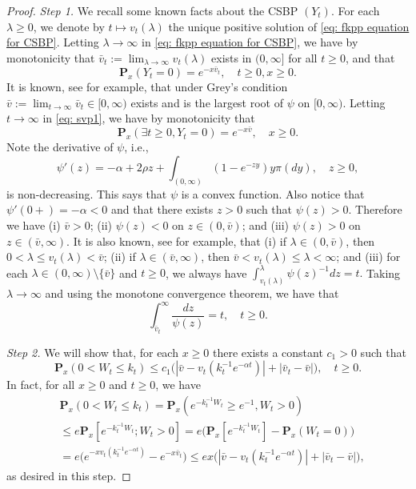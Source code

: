 \documentclass[EJP]{ejpecp} %
\begin{document}
\begin{proof}
	\emph{Step 1.} We recall some known facts about the CSBP $(Y_t)$.
  	For each $\lambda \geq 0$, we denote by $t\mapsto v_t(\lambda)$ the unique positive solution of \eqref{eq: fkpp equation for CSBP}.
  	Letting $\lambda \to \infty$ in \eqref{eq: fkpp equation for CSBP}, we have by monotonicity that $\bar v_t:= \lim_{\lambda \to \infty}v_t(\lambda)$ exists in $(0,\infty]$ for all $t\geq 0$, and that
\begin{equation}
\label{eq: svp1}
    \mathbf P_x(Y_t = 0)
    =e^{-x\bar v_t}, \quad t\geq 0, x\ge 0.
\end{equation}
  	It is known, see \cite[Theorems 3.5--3.8]{Li2011Measure-valued} for example, that under Grey's condition $\bar v:= \lim_{t\to \infty} \bar v_t \in [0,\infty)$ exists and is the largest root of $\psi$ on $[0,\infty)$.
  	Letting $t \to \infty$ in \eqref{eq: svp1}, we have by monotonicity that
\[
    \mathbf P_x(\exists t \geq 0, Y_t = 0)
    = e^{-x\bar v}, \quad x\geq 0.
\]
	Note the derivative of $\psi$, i.e.,
\[
    \psi'(z)
    = -\alpha + 2\rho z + \int_{(0,\infty)}(1-e^{-zy})y\pi(dy),\quad z\geq 0,
\]
  	is non-decreasing.
	This says that $\psi$ is a convex function.
  	Also notice that $\psi'(0+)=-\alpha <0$ and that there exists $z>0$ such that $\psi(z)>0$.
  	Therefore we have (i) $\bar v > 0$; (ii) $\psi(z) < 0$ on $z\in (0,\bar v)$; and (iii) $\psi(z) > 0 $ on $z\in (\bar v, \infty)$.
  	It is also known, see \cite[Proposition 3.3]{Li2011Measure-valued} for example, that (i) if $\lambda \in (0,\bar v)$, then $0<\lambda \leq v_t(\lambda)<\bar v $; (ii) if $\lambda \in (\bar v, \infty)$, then $\bar v < v_t(\lambda)\leq \lambda< \infty$; and (iii) for each $\lambda \in (0,\infty)\setminus \{\bar v\}$ and $t\geq 0$, we always have $\int_{v_t(\lambda)}^\lambda  \psi(z)^{-1}dz = t.$
  	Taking $\lambda \to \infty$ and using the monotone convergence theorem, we have that
\begin{equation}
\label{eq:svp2}
    \int_{\bar v_t}^\infty \frac{dz}{\psi(z)} 
    = t, 
    \quad t\geq 0.
\end{equation}

	\emph{Step 2.} We will show that, for each $x \geq 0$ there exists a constant $c_1>0$ such that
\[
	\mathbf P_{x}(0< W_t\leq k_t)
    \leq c_1\big(|\bar v- v_t(k_t^{-1}e^{-\alpha t})|+|\bar v_t - \bar v|\big),
    \quad t\geq 0.
\]
	In fact, for all $x\geq 0$ and $t\geq 0$, we have
\begin{align}
	& \mathbf P_{x}(0<W_t \leq k_t)
    = \mathbf P_{x}( e^{-k_t^{-1}W_t}\geq e^{-1},W_t > 0) \\
    & \leq e \mathbf P_{x}[e^{-k_t^{-1} W_t};W_t > 0]
    =  e\big(\mathbf P_x[e^{-k_t^{-1} W_t}]-\mathbf P_x(W_t = 0)\big) \\
    & = e\big(e^{-xv_t(k_t^{-1} e^{-\alpha t})}-e^{-x\bar v_t}\big)
    \leq ex \big(|\bar v-v_t(k_t^{-1} e^{-\alpha t})|+ |\bar v_t- \bar v|\big),
\end{align}
	as desired in this step.


\end{proof}
\end{document}
